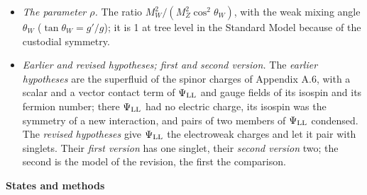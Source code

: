 \documentclass[
  10pt,
]{article}
\begin{document}
\begin{itemize}
  numbers of two Higgs doublets, the scalar content of the models with
  two Higgs doublets.
\item
  \emph{The parameter \(\rho\).} The ratio
  \(M_W^2/(M_Z^2\cos^2\theta_W)\), with the weak mixing angle
  \(\theta_W\) (\(\tan\theta_W=g'/g\)); it is 1 at tree level in the
  Standard Model because of the custodial symmetry.
\item
  \emph{Earlier and revised hypotheses; first and second version.} The
  \emph{earlier hypotheses} are the superfluid of the spinor charges of
  Appendix A.6, with a scalar and a vector contact term of
  \(\Psi_{\rm LL}\) and gauge fields of its isospin and its fermion
  number; there \(\Psi_{\rm LL}\) had no electric charge, its isospin
  was the symmetry of a new interaction, and pairs of two members of
  \(\Psi_{\rm LL}\) condensed. The \emph{revised hypotheses} give
  \(\Psi_{\rm LL}\) the electroweak charges and let it pair with
  singlets. Their \emph{first version} has one singlet, their
  \emph{second version} two; the second is the model of the revision,
  the first the comparison.
\end{itemize}

\textbf{States and methods}
\end{document}

